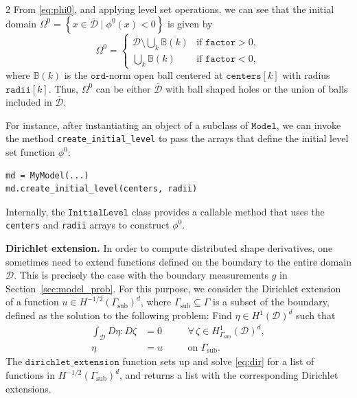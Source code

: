 \documentclass[a4paper, oneside]{article}
\newcommand{\hold}{\mathcal{D}}
\newcommand{\code}[1]{\texttt{#1}}
\begin{document}
\begin{multicols}{2}
From \eqref{eq:phi0}, and applying level set operations,
we can see that the initial domain
$\Omega^0=  \left\{x\in\overline{\mathcal{D}}\mid \phi^0(x) < 0\right\}$ is given by
\[
\Omega^0 = 
\begin{cases}
  \overline{\mathcal{D}} \setminus \bigcup_k \overline{\mathbb{B}(k)} & \text{if } \code{factor} > 0, \\
  \bigcup_k \mathbb{B}(k) & \text{if } \code{factor} < 0,
\end{cases}
\]
where $\mathbb{B}(k)$ is the $\code{ord}$-norm open ball
centered at $\code{centers}[k]$ with radius $\code{radii}[k]$.
Thus, $\Omega^0$ can be either
$\overline{\mathcal{D}}$ with ball shaped holes
or the union of balls included in $\overline{\mathcal{D}}$.

For instance,
after instantiating an object of a subclass of $\code{Model}$,
we can invoke the method \code{create\_initial\_level} to pass
the arrays that define the initial level set function $\phi^0$:
\begin{lstlisting}
md = MyModel(...)
md.create_initial_level(centers, radii)	
\end{lstlisting}
Internally, the $\code{InitialLevel}$ class
provides a callable method that uses the
\code{centers} and \code{radii} arrays to construct $\phi^0$.

\vspace*{0.5cm}
\noindent \textbf{Dirichlet extension.}
In order to compute distributed shape derivatives, one sometimes need to extend functions defined on the boundary to the entire domain $\hold$. 
This is precisely the case with the boundary measurements $g$ in Section~\ref{sec:model_prob}. 
For this purpose, we consider the Dirichlet extension of a function $u\in H^{-1/2}(\Gamma_{\text{sub}})^{d}$,
where $\Gamma_{\text{sub}}\subseteq \Gamma$ is a subset of the boundary, defined as the solution to the following problem:
Find $\eta\in H^1(\mathcal{D})^{d}$ such that
\begin{equation} \label{eq:dir}
\begin{aligned}
	\int_{\mathcal{D}} D\eta : D\zeta &= 0 &&\quad \forall\, \zeta \in H^1_{\Gamma_{\text{sub}}}(\mathcal{D})^{d}, \\
	\eta &= u &&\quad \text{on } \Gamma_{\text{sub}}.
\end{aligned}
\end{equation}
The $\code{dirichlet\_extension}$ function 
sets up and solve \eqref{eq:dir} for a list
of functions in $H^{-1/2}(\Gamma_{\text{sub}})^{d}$, and returns
a list with the corresponding Dirichlet extensions.


\end{multicols}
\end{document}

